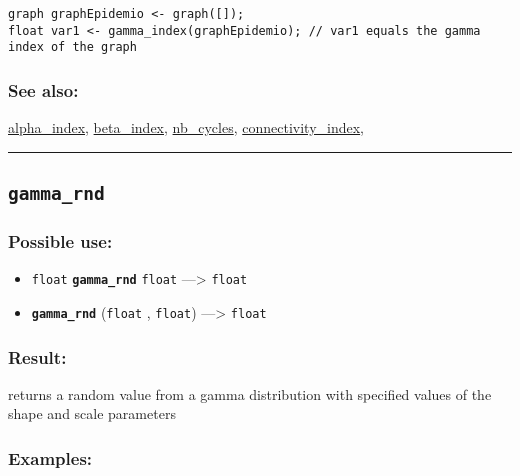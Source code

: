 \documentclass[]{book}
\providecommand{\tightlist}{%
  \setlength{\itemsep}{0pt}\setlength{\parskip}{0pt}}
\theoremstyle{definition}
\theoremstyle{definition}
\theoremstyle{definition}
\theoremstyle{remark}
\begin{document}
\begin{verbatim}
graph graphEpidemio <- graph([]);  
float var1 <- gamma_index(graphEpidemio); // var1 equals the gamma index of the graph
\end{verbatim}

\subsubsection{See also:}\label{see-also-101}

\href{operators-a-to-a.html\#alpha_index}{alpha\_index},
\href{operators-b-to-c.html\#beta_index}{beta\_index},
\href{operators-n-to-r.html\#nb_cycles}{nb\_cycles},
\href{operators-b-to-c.html\#connectivity_index}{connectivity\_index},

\begin{center}\rule{0.5\linewidth}{\linethickness}\end{center}

\subsection{\texorpdfstring{\texttt{gamma\_rnd}}{gamma\_rnd}}\label{gamma_rnd}

\subsubsection{Possible use:}\label{possible-use-184}

\begin{itemize}
\tightlist
\item
  \texttt{float} \textbf{\texttt{gamma\_rnd}} \texttt{float}
  ---\textgreater{} \texttt{float}
\item
  \textbf{\texttt{gamma\_rnd}} (\texttt{float} , \texttt{float})
  ---\textgreater{} \texttt{float}
\end{itemize}

\subsubsection{Result:}\label{result-178}

returns a random value from a gamma distribution with specified values
of the shape and scale parameters

\subsubsection{Examples:}\label{examples-134}
\end{document}
